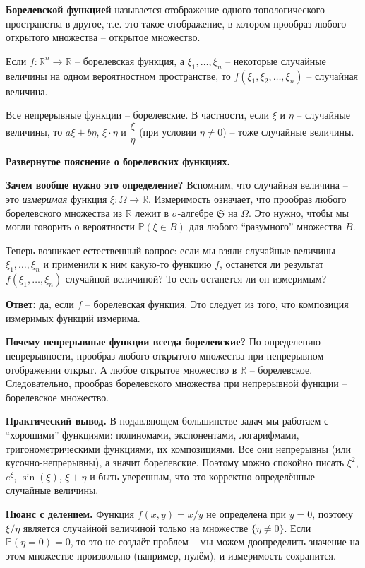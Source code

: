 \begin{definition}
\textbf{Борелевской функцией} называется отображение одного топологического пространства в другое, т.е. это такое отображение, в котором прообраз любого открытого множества -- открытое множество.
\end{definition}

\begin{theorem}
Если $f: \mathbb{R}^n \to \mathbb{R}$ -- борелевская функция, а $\xi_1, \ldots, \xi_n$ -- некоторые случайные величины на одном вероятностном пространстве, то $f(\xi_1, \xi_2, \ldots, \xi_n)$ -- случайная величина.
\end{theorem}

Все непрерывные функции -- борелевские. В частности, если $\xi$ и $\eta$ -- случайные величины, то $a\xi + b\eta$, $\xi \cdot \eta$ и $\dfrac{\xi}{\eta}$ (при условии $\eta \neq 0$) -- тоже случайные величины.

\begin{notice}
\textbf{Развернутое пояснение о борелевских функциях.}

\textbf{Зачем вообще нужно это определение?} Вспомним, что случайная величина -- это \textit{измеримая} функция $\xi: \Omega \to \mathbb{R}$. Измеримость означает, что прообраз любого борелевского множества из $\mathbb{R}$ лежит в $\sigma$-алгебре $\mathfrak{S}$ на $\Omega$. Это нужно, чтобы мы могли говорить о вероятности $\mathbb{P}(\xi \in B)$ для любого ``разумного'' множества $B$.

Теперь возникает естественный вопрос: если мы взяли случайные величины $\xi_1, \ldots, \xi_n$ и применили к ним какую-то функцию $f$, останется ли результат $f(\xi_1, \ldots, \xi_n)$ случайной величиной? То есть останется ли он измеримым?

\textbf{Ответ:} да, если $f$ -- борелевская функция. Это следует из того, что композиция измеримых функций измерима.

\textbf{Почему непрерывные функции всегда борелевские?} По определению непрерывности, прообраз любого открытого множества при непрерывном отображении открыт. А любое открытое множество в $\mathbb{R}$ -- борелевское. Следовательно, прообраз борелевского множества при непрерывной функции -- борелевское множество.

\textbf{Практический вывод.} В подавляющем большинстве задач мы работаем с ``хорошими'' функциями: полиномами, экспонентами, логарифмами, тригонометрическими функциями, их композициями. Все они непрерывны (или кусочно-непрерывны), а значит борелевские. Поэтому можно спокойно писать $\xi^2$, $e^{\xi}$, $\sin(\xi)$, $\xi + \eta$ и быть уверенным, что это корректно определённые случайные величины.

\textbf{Нюанс с делением.} Функция $f(x, y) = x/y$ не определена при $y = 0$, поэтому $\xi/\eta$ является случайной величиной только на множестве $\{\eta \neq 0\}$. Если $\mathbb{P}(\eta = 0) = 0$, то это не создаёт проблем -- мы можем доопределить значение на этом множестве произвольно (например, нулём), и измеримость сохранится.
\end{notice}
